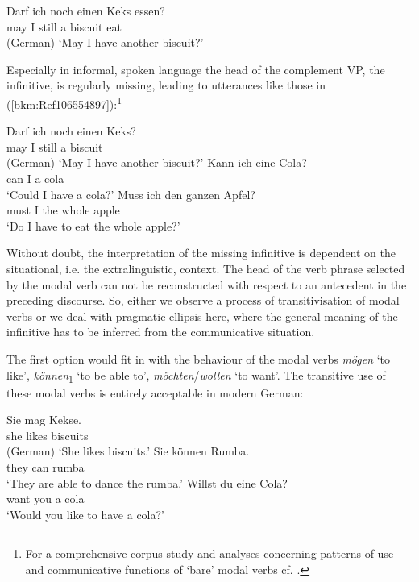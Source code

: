 \documentclass[output=paper
  ,nobabel
  ,draftmode
  ,colorlinks, citecolor=brown
]{langscibook}
\begin{document}
\ea
\label{bkm:Ref106554656}
\gll Darf  ich  noch  einen   Keks      essen? \\
     may  I      still    a          biscuit   eat\\\hfill(German)
\glt `May I have another biscuit?'
\z

\noindent
Especially in informal, spoken language the head of the complement VP, the infinitive, is
regularly missing, leading to utterances like those in (\ref{bkm:Ref106554897}):\footnote{For a
    comprehensive corpus study and analyses concerning patterns of use and communicative functions
    of `bare' modal verbs cf. \citet{Kaiser2017}.}

\eal
\label{bkm:Ref106554897}
\ex
\gll Darf  ich  noch  einen   Keks?\\
     may  I      still    a          biscuit \\\hfill(German)
\glt   `May I have another biscuit?'
\ex
\gll Kann  ich  eine   Cola?\\
       can     I      a       cola \\
\glt   `Could I have a cola?'
\ex
\gll Muss   ich   den    ganzen    Apfel?\\
       must    I      the     whole      apple \\
\glt   `Do I have to eat the whole apple?'
\zl

\noindent
Without doubt, the interpretation of the missing infinitive is dependent on the situational,
i.e. the extralinguistic, context. The head of the verb phrase selected by the modal verb can not be
reconstructed with respect to an antecedent in the preceding discourse. So, either we observe a
process of transitivisation of modal verbs or we deal with pragmatic ellipsis here, where the
general meaning of the infinitive has to be inferred from the communicative situation.

The first option would fit in with the behaviour of the modal verbs \emph{mögen} `to like',
\emph{können}\textsubscript{1} `to be able to', \emph{möchten}/\emph{wollen} `to want'. The
transitive use of these modal verbs is entirely acceptable in modern German:

\eal
\label{bkm:Ref106556883}
\ex
\gll Sie  mag       Kekse.\\
       she  likes      biscuits \\\hfill(German)
\glt   `She likes biscuits.'
\ex
\gll Sie     können  Rumba.\\
       they   can        rumba \\
\glt   `They are able to dance the rumba.'
\ex
\gll Willst  du    eine   Cola?\\
       want    you  a        cola \\
\glt   `Would you like to have a cola?'
\zl
\end{document}

